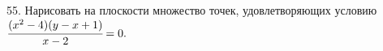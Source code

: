 55. Нарисовать на плоскости множество точек, удовлетворяющих условию
$\cfrac{(x^2-4)(y-x+1)}{x-2}=0.$\\
